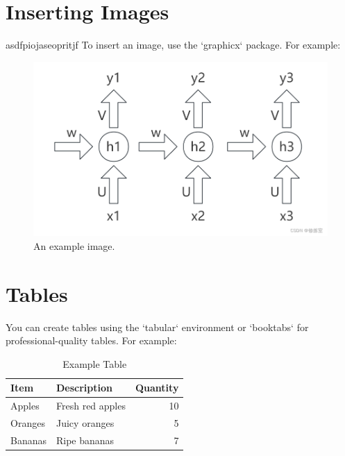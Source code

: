 \documentclass[12pt,a4paper]{article}
\begin{document}
\printbibliography


\section{Inserting Images}
asdfpiojaseopritjf
To insert an image, use the `graphicx` package. For example:

\begin{figure}[!htb]
    \centering
    \includegraphics[width=1\textwidth]{../Pic/pic1.png} %
    \caption{An example image.}
    \label{fig:example}
\end{figure}

\section{Tables}
You can create tables using the `tabular` environment or `booktabs` for professional-quality tables. For example:

\begin{table}[h!]
\centering
\caption{Example Table}
\begin{tabular}{@{}llr@{}}
\toprule
\textbf{Item} & \textbf{Description} & \textbf{Quantity} \\ \midrule
Apples        & Fresh red apples     & 10                \\
Oranges       & Juicy oranges        & 5                 \\
Bananas       & Ripe bananas         & 7                 \\ \bottomrule
\end{tabular}
\label{tab:example}
\end{table}
\end{document}
